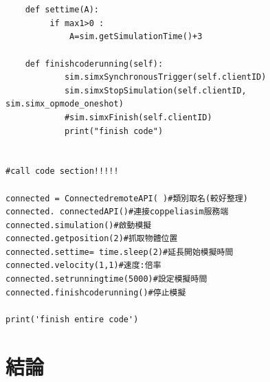 \documentclass[14pt,a4paper]{report}  %
\newcommand{\fourteen}{\fontsize{14pt}{\baselineskip}\selectfont}%
\begin{document}
{\begin{itemize}
\begin{lstlisting}[caption=遠端API程式架構]
                 

    def settime(A):
         if max1>0 :
             A=sim.getSimulationTime()+3 

    def finishcoderunning(self): 
            sim.simxSynchronousTrigger(self.clientID)
            sim.simxStopSimulation(self.clientID, sim.simx_opmode_oneshot)
            #sim.simxFinish(self.clientID)
            print("finish code")
        
        
#call code section!!!!!

connected = ConnectedremoteAPI( )#類別取名(較好整理)
connected. connectedAPI()#連接coppeliasim服務端
connected.simulation()#啟動模擬
connected.getposition(2)#抓取物體位置
connected.settime= time.sleep(2)#延長開始模擬時間
connected.velocity(1,1)#速度:倍率
connected.setrunningtime(5000)#設定模擬時間
connected.finishcoderunning()#停止模擬

print('finish entire code')
		\end{lstlisting}
		\end{itemize}

    	
        \chapter{結論}
        {\begin{flushleft}
        \quad \quad \fourteen {對於科技的迅速進步，開源已成了當今趨勢，因此本專題所用的套件不僅能達到其他平面機構套件大部分所擁有的功能但又有公開原始碼的優勢因此在後續的發展應該會比相對封閉的套件更加快速。而在CAD當中常有許多相似專案但是每次繪製不同零件時又要從頭開始繪製的情形，此時若沒有一套程式流程將會產生高耗時的問題，因此在本專題中所建立的自動3D零件生成以及後續利用xml檔完成組立、碰撞設定、馬達轉軸輸出設定......再直接匯入至動態分析套件減少了很多我們在進行不同機構範例分析的時間。後續Pyslvs-UI若能有更多的機構類型或是做後續的CAE分析應該能有更完整的設計流程。}
        \end{flushleft}

}}
\end{document}
